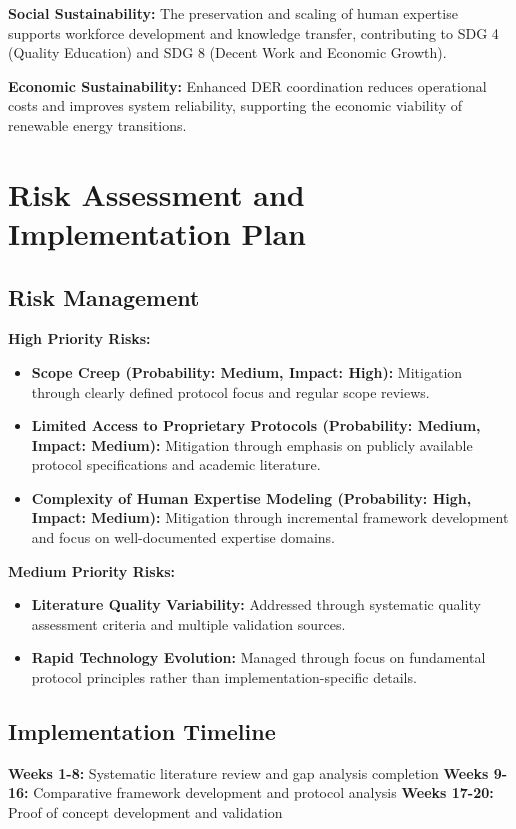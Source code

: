 \documentclass[12pt,a4paper]{article}
\begin{document}
\textbf{Social Sustainability:} The preservation and scaling of human expertise supports workforce development and knowledge transfer, contributing to SDG 4 (Quality Education) and SDG 8 (Decent Work and Economic Growth).

\textbf{Economic Sustainability:} Enhanced DER coordination reduces operational costs and improves system reliability, supporting the economic viability of renewable energy transitions.

\section{Risk Assessment and Implementation Plan}
\label{sec:risks}

\subsection{Risk Management}

\textbf{High Priority Risks:}
\begin{itemize}
\item \textbf{Scope Creep (Probability: Medium, Impact: High):} Mitigation through clearly defined protocol focus and regular scope reviews.
\item \textbf{Limited Access to Proprietary Protocols (Probability: Medium, Impact: Medium):} Mitigation through emphasis on publicly available protocol specifications and academic literature.
\item \textbf{Complexity of Human Expertise Modeling (Probability: High, Impact: Medium):} Mitigation through incremental framework development and focus on well-documented expertise domains.
\end{itemize}

\textbf{Medium Priority Risks:}
\begin{itemize}
\item \textbf{Literature Quality Variability:} Addressed through systematic quality assessment criteria and multiple validation sources.
\item \textbf{Rapid Technology Evolution:} Managed through focus on fundamental protocol principles rather than implementation-specific details.
\end{itemize}

\subsection{Implementation Timeline}

\textbf{Weeks 1-8:} Systematic literature review and gap analysis completion
\textbf{Weeks 9-16:} Comparative framework development and protocol analysis
\textbf{Weeks 17-20:} Proof of concept development and validation
\end{document}
